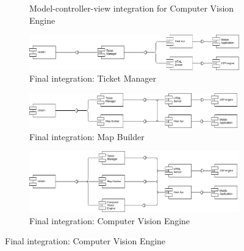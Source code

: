 \documentclass{article}
\begin{document}
\begin{figure}[h]
\begin{subfigure}[H]{\linewidth}
			\caption{Model-controller-view integration for Computer Vision Engine}
		\end{subfigure}
		\begin{subfigure}[H]{\linewidth}
			\includegraphics[width=\linewidth]{images/Integration_basicLogic_4.png}
			\caption{Final integration: Ticket Manager}
		\end{subfigure}
		\begin{subfigure}[H]{\linewidth}
			\includegraphics[width=\linewidth]{images/Integration_basicLogic_8.png}
			\caption{Final integration: Map Builder}
		\end{subfigure}
		\begin{subfigure}[H]{\linewidth}
			\includegraphics[width=\linewidth]{images/Integration_basicLogic_12.png}
			\caption{Final integration: Computer Vision Engine}
		\end{subfigure}
	\end{figure}
\end{document}
